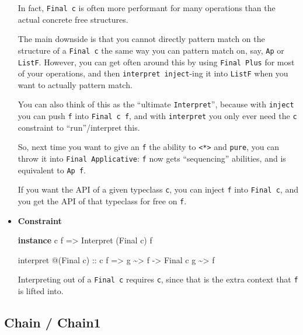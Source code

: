 \documentclass[]{article}
\newenvironment{Shaded}{}{}
\newcommand{\DataTypeTok}[1]{\textcolor[rgb]{0.56,0.13,0.00}{#1}}
\newcommand{\KeywordTok}[1]{\textcolor[rgb]{0.00,0.44,0.13}{\textbf{#1}}}
\newcommand{\NormalTok}[1]{#1}
\newcommand{\OperatorTok}[1]{\textcolor[rgb]{0.40,0.40,0.40}{#1}}
\newcommand{\OtherTok}[1]{\textcolor[rgb]{0.00,0.44,0.13}{#1}}
\begin{document}
\begin{itemize}
  In fact, \texttt{Final\ c} is often more performant for many operations than
  the actual concrete free structures.

  The main downside is that you cannot directly pattern match on the structure
  of a \texttt{Final\ c} the same way you can pattern match on, say, \texttt{Ap}
  or \texttt{ListF}. However, you can get often around this by using
  \texttt{Final\ Plus} for most of your operations, and then
  \texttt{interpret\ inject}-ing it into \texttt{ListF} when you want to
  actually pattern match.

  You can also think of this as the ``ultimate \texttt{Interpret}'', because
  with \texttt{inject} you can push \texttt{f} into \texttt{Final\ c\ f}, and
  with \texttt{interpret} you only ever need the \texttt{c} constraint to
  ``run''/interpret this.

  So, next time you want to give an \texttt{f} the ability to
  \texttt{\textless{}*\textgreater{}} and \texttt{pure}, you can throw it into
  \texttt{Final\ Applicative}: \texttt{f} now gets ``sequencing'' abilities, and
  is equivalent to \texttt{Ap\ f}.

  If you want the API of a given typeclass \texttt{c}, you can inject \texttt{f}
  into \texttt{Final\ c}, and you get the API of that typeclass for free on
  \texttt{f}.
\item
  \textbf{Constraint}

\begin{Shaded}
\begin{Highlighting}[]
\KeywordTok{instance}\NormalTok{ c f }\OtherTok{=>} \DataTypeTok{Interpret}\NormalTok{ (}\DataTypeTok{Final}\NormalTok{ c) f}

\NormalTok{interpret }\OperatorTok{@}\NormalTok{(}\DataTypeTok{Final}\NormalTok{ c)}
\OtherTok{    ::}\NormalTok{ c f}
    \OtherTok{=>}\NormalTok{ g }\OperatorTok{\textasciitilde{}>}\NormalTok{ f}
    \OtherTok{{-}>} \DataTypeTok{Final}\NormalTok{ c g }\OperatorTok{\textasciitilde{}>}\NormalTok{ f}
\end{Highlighting}
\end{Shaded}

  Interpreting out of a \texttt{Final\ c} requires \texttt{c}, since that is the
  extra context that \texttt{f} is lifted into.
\end{itemize}

\hypertarget{chain-chain1}{%
\subsection{Chain / Chain1}\label{chain-chain1}}
\end{document}
